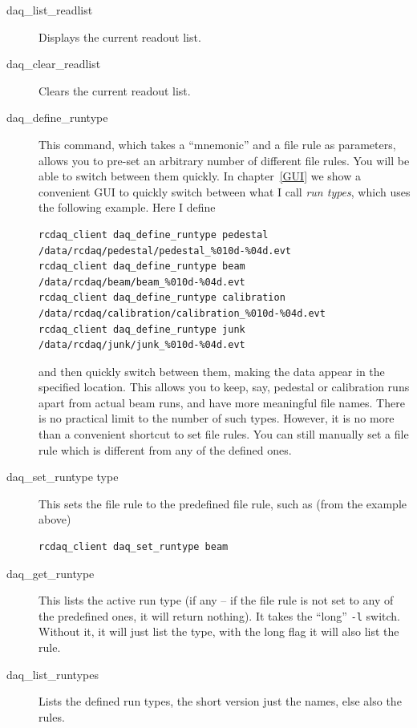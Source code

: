 \documentclass{article}[11pt]
\begin{document}
\begin{description}
\item[daq\_list\_readlist] Displays the current readout list.

\item[daq\_clear\_readlist] Clears the current readout list.

\item[daq\_define\_runtype] This command, which takes a
  ``mnemonic'' and a file rule as parameters, allows you to pre-set an
  arbitrary number of different file rules. You will be able to switch
  between them quickly. In chapter~\ref{GUI} we show a convenient GUI
  to quickly switch between what I call \emph{run types}, which uses
  the following example. Here I define

\begin{verbatim}
rcdaq_client daq_define_runtype pedestal     /data/rcdaq/pedestal/pedestal_%010d-%04d.evt
rcdaq_client daq_define_runtype beam         /data/rcdaq/beam/beam_%010d-%04d.evt
rcdaq_client daq_define_runtype calibration  /data/rcdaq/calibration/calibration_%010d-%04d.evt
rcdaq_client daq_define_runtype junk         /data/rcdaq/junk/junk_%010d-%04d.evt
\end{verbatim}

and then quickly switch between them, making the data appear in the
specified location. This allows you to keep, say, pedestal or
calibration runs apart from actual beam runs, and have more meaningful
file names.  There is no practical limit to the number of such
types. However, it is no more than a convenient shortcut to set file
rules. You can still manually set a file rule which is different from
any of the defined ones.

\item[daq\_set\_runtype type] This sets the file rule to the
  predefined file rule, such as (from the example above)

\begin{verbatim}
rcdaq_client daq_set_runtype beam
\end{verbatim}
 
\item[daq\_get\_runtype] This lists the active run type (if any
  -- if the file rule is not set to any of the predefined ones, it
  will return nothing). It takes the ``long'' \verb|-l|
  switch. Without it, it will just list the type, with the long flag
  it will also list the rule.

\item[daq\_list\_runtypes]  Lists the defined run types,
  the short version just the names, else also the rules.


\end{description}
\end{document}
